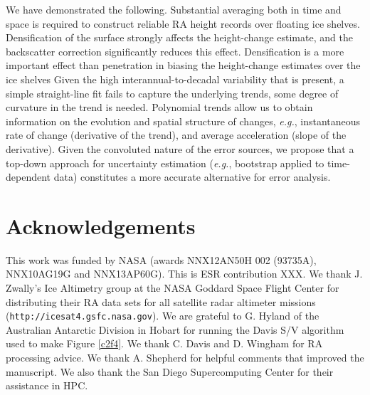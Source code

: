 We have demonstrated the following. Substantial averaging both in time and space is required to construct reliable RA height records over floating ice shelves. Densification of the surface strongly affects the height-change estimate, and the backscatter correction significantly reduces this effect. Densification is a more important effect than penetration in biasing the height-change estimates over the ice shelves Given the high interannual-to-decadal variability that is present, a simple straight-line fit fails to capture the underlying trends, some degree of curvature in the trend is needed. Polynomial trends allow us to obtain information on the evolution and spatial structure of changes, {\it e.g.}, instantaneous rate of change (derivative of the trend), and average acceleration (slope of the derivative). Given the convoluted nature of the error sources, we propose that a top-down approach for uncertainty estimation ({\it e.g.}, bootstrap applied to time-dependent data) constitutes a more accurate alternative for error analysis.

\section*{Acknowledgements}

This work was funded by NASA (awards NNX12AN50H 002 (93735A), NNX10AG19G and NNX13AP60G). This is ESR contribution XXX. We thank J. Zwally's Ice Altimetry group at the NASA Goddard Space Flight Center for distributing their RA data sets for all satellite radar altimeter missions ({\tt http://icesat4.gsfc.nasa.gov}). We are grateful to G. Hyland of the Australian Antarctic Division in Hobart for running the Davis S/V algorithm used to make Figure \ref{c2f4}. We thank C. Davis and D. Wingham for RA processing advice. We thank A. Shepherd for helpful comments that improved the manuscript. We also thank the San Diego Supercomputing Center for their assistance in HPC. 
